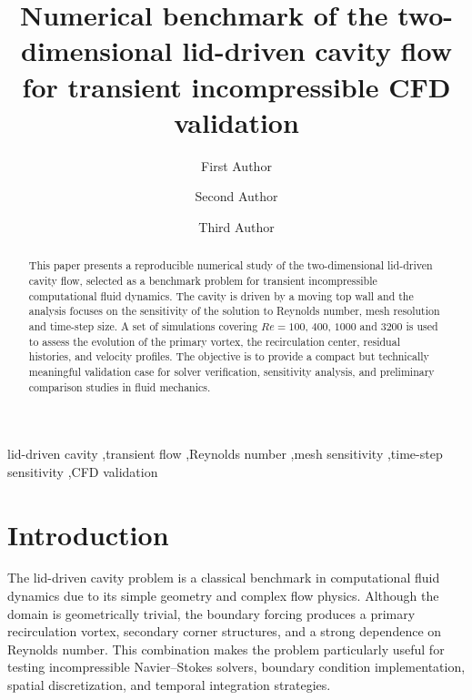 \documentclass[final,3p,times]{elsarticle}
\begin{document}
\begin{frontmatter}

\title{Numerical benchmark of the two-dimensional lid-driven cavity flow for transient incompressible CFD validation}

\author[1]{First Author}
\author[2]{Second Author}
\author[3]{Third Author}

\address[1]{Department of Mechanical Engineering, University A}
\address[2]{Department of Fluid Dynamics, Institute B}
\address[3]{Department of Applied Mathematics, University C}

\begin{abstract}
This paper presents a reproducible numerical study of the two-dimensional lid-driven cavity flow, selected as a benchmark problem for transient incompressible computational fluid dynamics. The cavity is driven by a moving top wall and the analysis focuses on the sensitivity of the solution to Reynolds number, mesh resolution and time-step size. A set of simulations covering $Re = 100$, $400$, $1000$ and $3200$ is used to assess the evolution of the primary vortex, the recirculation center, residual histories, and velocity profiles. The objective is to provide a compact but technically meaningful validation case for solver verification, sensitivity analysis, and preliminary comparison studies in fluid mechanics.
\end{abstract}

\begin{keyword}
 lid-driven cavity \sep transient flow \sep Reynolds number \sep mesh sensitivity \sep time-step sensitivity \sep CFD validation
\end{keyword}

\end{frontmatter}

\section{Introduction}

The lid-driven cavity problem is a classical benchmark in computational fluid dynamics due to its simple geometry and complex flow physics. Although the domain is geometrically trivial, the boundary forcing produces a primary recirculation vortex, secondary corner structures, and a strong dependence on Reynolds number. This combination makes the problem particularly useful for testing incompressible Navier--Stokes solvers, boundary condition implementation, spatial discretization, and temporal integration strategies.
\end{document}
